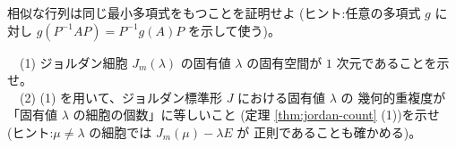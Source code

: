 \begin{mondai}[証明]\label{q:jordan-ex11}
相似な行列は同じ最小多項式をもつことを証明せよ
(ヒント:任意の多項式 $g$ に対し
$g(P^{-1}AP) = P^{-1}g(A)P$ を示して使う)。
\end{mondai}

\begin{mondai}[証明]\label{q:jordan-ex12}
　(1) ジョルダン細胞 $J_m(\lambda)$ の固有値 $\lambda$ の固有空間が
$1$ 次元であることを示せ。\\
　(2) (1) を用いて、ジョルダン標準形 $J$ における固有値 $\lambda$ の
幾何的重複度が「固有値 $\lambda$ の細胞の個数」に等しいこと
(定理 \ref{thm:jordan-count} (1))を示せ
(ヒント:$\mu \neq \lambda$ の細胞では $J_m(\mu) - \lambda E$ が
正則であることも確かめる)。
\end{mondai}

